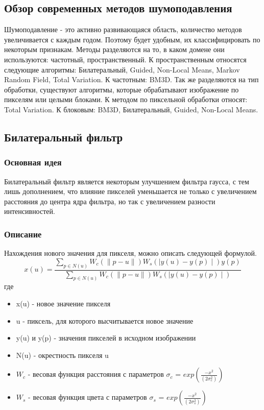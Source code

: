 
\subsection{Обзор современных методов шумоподавления}
Шумоподавление - это активно развивающаяся область, количество методов увеличивается с каждым годом. Поэтому будет удобным, их классифицировать по некоторым признакам. Методы разделяются на то, в каком домене они используются: частотный, пространственный.
К пространственным относятся следующие алгоритмы: Билатеральный, Guided, Non-Local Means, Markov Random Field, Total Variation.
К частотным: BM3D.
Так же разделяются на тип обработки, существуют алгоритмы, которые обрабатывают изображение по пикселям или целыми блоками.
К методом по пиксельной обработки относят: Total Variation.
К блоковым: BM3D, Билатеральный, Guided, Non-Local Means.
\subsection{Билатеральный фильтр}
\subsubsection{Основная идея}
Билатеральный фильтр является некоторым улучшением фильтра гаусса, с тем лишь дополнением, что влияние пикселей уменьшается не только с увеличением расстояния до центра ядра фильтра, но так с увеличением разности интенсивностей.
\subsubsection{Описание}
Нахождения нового значения для пикселя, можно описать следующей формулой.
\begin{equation}
x(u) = \frac{\sum_{p\in N(u)}W_c(\parallel p - u\parallel)W_s(\mid y(u) - y(p)\mid)y(p)}
{\sum_{p\in N(u)}W_c(\parallel p - u\parallel)W_s(\mid y(u) - y(p)\mid)}
\end{equation}
где
\begin{itemize}
\item x(u) - новое значение пикселя
\item u - пиксель, для которого высчитывается новое значение
\item y(u) и y(p) - значения пикселей в исходном изображении
\item N(u) - окрестность пикселя u
\item $W_c$ - весовая функция расстояния с параметров $\sigma_c$ = $exp(\frac{-x^2}{(2\sigma_c^2)})$
\item $W_s$ - весовая функция цвета с параметров $\sigma_s$ = $exp(\frac{-x^2}{(2\sigma_s^2)})$
\end{itemize}

